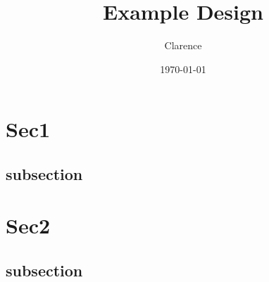 \documentclass[UTF8]{atom}
\title{Example Design}
\date{\today}
\author{Clarence}
\begin{document}
\section{Sec1}
\zhlipsum[1]
\subsection{subsection}
\zhlipsum[3-7]

\section{Sec2}
\zhlipsum[8]
\subsection{subsection}
\zhlipsum[9-10]
\end{document}
